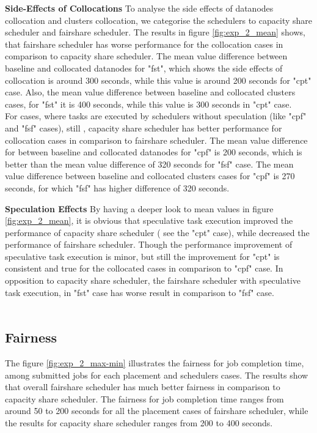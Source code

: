 \textbf{Side-Effects of Collocations } To analyse the side effects of datanodes collocation and clusters collocation, we categorise the schedulers to capacity share scheduler and fairshare scheduler. The results in figure \ref{fig:exp_2_mean} shows, that fairshare scheduler has worse performance for the collocation cases in comparison to capacity share scheduler. The mean value difference between baseline and collocated datanodes for "fst", which shows the side effects of collocation is around 300 seconds, while this value is around 200 seconds for "cpt" case. Also, the mean value difference between baseline and collocated clusters cases, for "fst" it is 400 seconds, while this value is 300 seconds in "cpt" case.\\ 

For cases, where tasks are executed by schedulers without speculation (like "cpf" and "fsf" cases), still , capacity share scheduler has better performance for collocation cases in comparison to fairshare scheduler. The mean value difference for between baseline and collocated datanodes for "cpf" is 200 seconds, which is better than the mean value difference of 320 seconds for "fsf" case. The mean value difference between baseline and collocated clusters cases for "cpf" is 270 seconds, for which "fsf" has higher difference of 320 seconds. 


\textbf{Speculation Effects } By having a deeper look to mean values in figure \ref{fig:exp_2_mean}, it is obvious that speculative task execution improved the performance of capacity share scheduler ( see the "cpt" case), while decreased the performance of fairshare scheduler. Though the performance improvement of speculative task execution is minor, but still the improvement for "cpt"‌ is consistent and true for the collocated cases in comparison to "cpf" case. In opposition to capacity share scheduler, the  fairshare scheduler with speculative task execution, in "fst" case has worse result in comparison to "fsf" case. \\  ‌  


 \subsection{Fairness}
 The figure \ref{fig:exp_2_max-min} illustrates the fairness for job completion time, among submitted jobs for each placement and schedulers cases. The results show that overall fairshare scheduler has much better fairness in comparison to capacity share scheduler. The fairness for job completion time ranges from around 50 to 200 seconds for all the placement cases of fairshare scheduler, while the results for capacity share scheduler ranges from 200 to 400 seconds.\\ 
 
